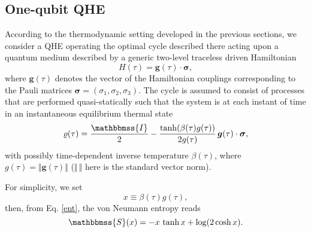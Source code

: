 \documentclass[aps,pra,floatfix,twocolumn,groupedaddress,superscriptaddress,nofootinbib,notitlepage,amsmath,amssymb,]{revtex4-1}
\begin{document}
\subsection{One-qubit QHE}

According to the thermodynamic setting developed in the previous sections, we consider a QHE operating the optimal cycle described there acting upon a quantum medium described by a generic two-level traceless driven Hamiltonian 
\begin{equation}
\label{1qHam}
H(\tau) = \bm{g}(\tau)\cdot \bm{\sigma},
\end{equation}
where $\bm{g}(\tau)$ denotes the vector of the Hamiltonian couplings corresponding to the Pauli matrices $\bm{\sigma}=(\sigma_1, \sigma_2, \sigma_3)$. The cycle is assumed to consist of processes that are performed quasi-statically such that the system is at each instant of time in an instantaneous equilibrium thermal state 
\begin{equation}
\label{eq:thermalstate}
\varrho(\tau) = \frac{\mathbbmss{I}}{2} - \frac{\tanh(\beta(\tau)g(\tau))}{2g(\tau)}\,  \bm{g}(\tau)\cdot\bm{\sigma},
\end{equation}
with possibly time-dependent inverse temperature $\beta(\tau)$, 
where $g(\tau)=\Vert \bm{g}(\tau)\Vert$ ($\Vert \,\Vert$ here is the standard vector norm).

For simplicity, we set 
\begin{equation}
x\equiv\beta(\tau)g(\tau),
\end{equation}
then, from Eq. \eqref{ent}, the von Neumann entropy reads
\begin{equation}
\mathbbmss{S}(x) =   -x\,\tanh x +\log( 2 \cosh x).
\label{eq:tdpot}
\end{equation}
\end{document}
